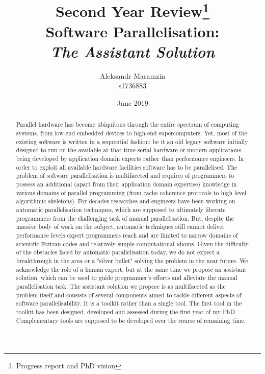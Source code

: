 \documentclass[10pt,a4paper]{report}
\title{\centering \textbf{Second Year Review\thanks{Progress report and PhD vision}}\\Software Parallelisation:\\\textit{The Assistant Solution}}
\author{Aleksandr Maramzin\\s1736883}
\date{June 2019}
\begin{document}
\maketitle

\begin{abstract}


\quad Parallel hardware has become ubiquitous through the entire spectrum of computing systems, from low-end embedded devices to high-end supercomputers. Yet, most of the existing software is written in a sequential fashion: be it an old legacy software initially designed to run on the available at that time serial hardware or modern applications being developed by application domain experts rather than performance engineers. In order to exploit all available hardware facilities software has to be parallelised.\newline\null
\quad The problem of software parallelisation is multifaceted and requires of programmers to possess an additional (apart from their application domain expertise) knowledge in various domains of parallel programming (from cache coherence protocols to high level algorithmic skeletons). For decades researches and engineers have been working on automatic parallelisation techniques, which are supposed to ultimately liberate programmers from the challenging task of manual parallelisation. But, despite the massive body of work on the subject, automatic techniques still cannot deliver performance levels expert programmers reach and are limited to narrow domains of scientific Fortran codes and relatively simple computational idioms.\newline\null
\quad Given the difficulty of the obstacles faced by automatic parallelisation today, we do not expect a breakthrough in the area or a "silver bullet" solving the problem in the near future. We acknowledge the role of a human expert, but at the same time we propose an assistant solution, which can be used to guide programmer's efforts and alleviate the manual parallelisation task.\newline\null
\quad The assistant solution we propose is as multifaceted as the problem itself and consists of several components aimed to tackle different aspects of software parallelisability. It is a toolkit rather than a single tool. The first tool in the toolkit has been designed, developed and assessed during the first year of my PhD. Complementary tools are supposed to be developed over the course of remaining time.\newline\null

\end{abstract}
\end{document}
